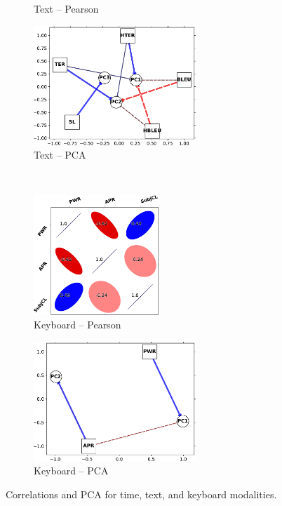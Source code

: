 \documentclass[output=paper]{langsci/langscibook}
\begin{document}
\begin{figure}
\begin{subfigure}[b]{0.5\textwidth}
        \caption{Text -- Pearson}
    \end{subfigure}%
    \begin{subfigure}[b]{0.5\textwidth}\centering
        \includegraphics[height=4.5cm]{figures/text-PCA-cropped.pdf}
        \caption{Text -- PCA}
    \end{subfigure}\bigskip\\
    \begin{subfigure}[b]{0.5\textwidth}\centering
        \includegraphics[height=4.5cm]{figures/keyboard-pearson-cropped.pdf}
        \caption{Keyboard -- Pearson}
    \end{subfigure}%
    \begin{subfigure}[b]{0.5\textwidth}\centering
        \includegraphics[height=4.5cm]{figures/keyboard-PCA-cropped.pdf}
        \caption{Keyboard -- PCA}
    \end{subfigure}
    \caption{Correlations and PCA for time, text, and keyboard modalities.\label{fig:plotscorrpca1}}
\end{figure}
\end{document}
